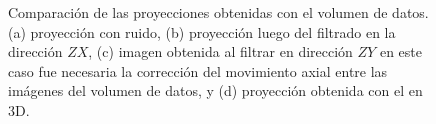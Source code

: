 \begin{figure}[ht!]
	\centering
	\caption[Comparación proyecciones \enface filtradas]{Comparación de las proyecciones \enface obtenidas con el volumen de datos. (a) proyección \enface con ruido, (b) proyección luego del filtrado en la dirección $ZX$, (c) imagen \enface obtenida al filtrar en dirección $ZY$ en este caso fue necesaria la corrección del movimiento axial entre las imágenes del volumen de datos, y (d) proyección \enface obtenida con el \nlmeans en 3D.}
	\label{fig:retinal_en_face}
\end{figure}

